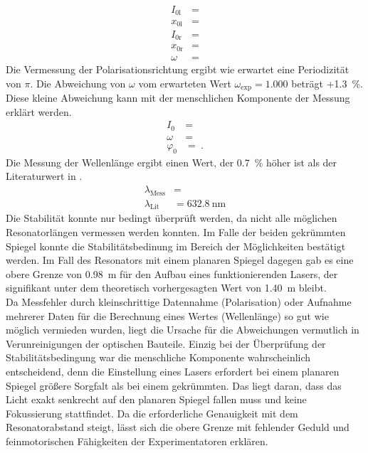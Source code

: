 \begin{align*}
	I_\text{0l} &=  \\
	x_\text{0l} &=  \\
	I_\text{0r} &=   \\
	x_\text{0r} &=  \\
	\omega &=   
\end{align*}
Die Vermessung der Polarisationsrichtung ergibt wie erwartet eine Periodizität von $\pi$. Die Abweichung von $\omega$ vom erwarteten Wert $\omega_\text{exp}=1.000$ beträgt +\SI{1.3}{\%}. Diese kleine Abweichung kann mit der menschlichen Komponente der Messung erklärt werden. \\
\begin{align*}
	I_0 &=  \\
	\omega &=  \\
	\varphi_0 &=  \ .
\end{align*}
Die Messung der Wellenlänge ergibt einen Wert, der \SI{0.7}{\%} höher ist als der Literaturwert in \cite{V61}. \\
\begin{align*}
	\lambda_{\textrm{Mess}} &=  \\ 	\lambda_{\textrm{Lit}} &= \SI{632,8}{\nano\meter}
\end{align*}
Die Stabilität konnte nur bedingt überprüft werden, da nicht alle möglichen Resonatorlängen vermessen werden konnten. Im Falle der beiden gekrümmten Spiegel konnte die Stabilitätsbedinung im Bereich der Möglichkeiten bestätigt werden. Im Fall des Resonators mit einem planaren Spiegel dagegen gab es eine obere Grenze von \SI{0.98}{\metre} für den Aufbau eines funktionierenden Lasers, der signifikant unter dem theoretisch vorhergesagten Wert von \SI{1.40}{\metre} bleibt. \\
Da Messfehler durch kleinschrittige Datennahme (Polarisation) oder Aufnahme mehrerer Daten für die Berechnung eines Wertes (Wellenlänge) so gut wie möglich vermieden wurden, liegt die Ursache für die Abweichungen vermutlich in Verunreinigungen der optischen Bauteile. Einzig bei der Überprüfung der Stabilitätsbedingung war die menschliche Komponente wahrscheinlich entscheidend, denn die Einstellung eines Lasers erfordert bei einem planaren Spiegel größere Sorgfalt als bei einem gekrümmten. Das liegt daran, dass das Licht exakt senkrecht auf den planaren Spiegel fallen muss und keine Fokussierung stattfindet. Da die erforderliche Genauigkeit mit dem Resonatorabstand steigt, lässt sich die obere Grenze mit fehlender Geduld und feinmotorischen Fähigkeiten der Experimentatoren erklären.